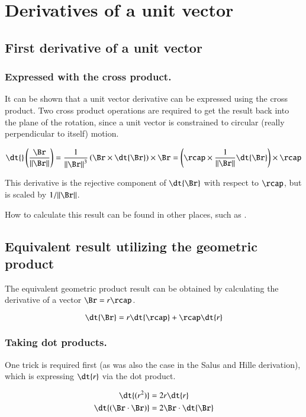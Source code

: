 \chapter{Derivatives of a unit vector}\label{chap:PJUnitDer}
\date{ Oct 16, 2007.  $RCSfile: gaWikiUnitDerivative.tex,v $ Last $Revision: 1.9 $ $Date: 2009/06/11 16:45:58 $ }

\section{First derivative of a unit vector}

\subsection{Expressed with the cross product.}

It can be shown that a unit vector derivative can be expressed using the cross product.  Two cross product operations are required to get the result back into the plane of the rotation, since a unit vector is constrained to circular (really perpendicular to itself) motion.

\[
\dt{}\left(\frac{\Br}{\Vert \Br \Vert}\right)
= \frac{1}{{\Vert \Br \Vert}^3}\left(\Br \times \dt{\Br}\right) \times \Br
= \left(\rcap \times \frac{1}{{\Vert \Br \Vert}} \dt{\Br}\right) \times \rcap
\]

This derivative is the rejective component of $\dt{\Br}$ with respect to $\rcap$, but is scaled by $1/\Vert \Br \Vert$.

How to calculate this result can be found in other places, such as
\cite{salas1990coa}.

\section{Equivalent result utilizing the geometric product}

The equivalent geometric product result can be obtained by calculating the derivative of a vector $\Br = r \rcap$.

\[
\dt{\Br} = r \dt{\rcap} + \rcap \dt{r} 
\]

\subsection{Taking dot products.}
One trick is required first (as was also the case in the Salus and Hille derivation), which is expressing $\dt{r}$ via the dot product.

\begin{align*}
\dt{(r^2)} &= 2r \dt{r} \\
\dt{(\Br \cdot \Br)} &= 2 \Br \cdot \dt{\Br} \\
\end{align*}

